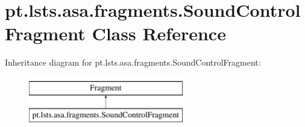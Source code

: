 \hypertarget{classpt_1_1lsts_1_1asa_1_1fragments_1_1SoundControlFragment}{}\section{pt.\+lsts.\+asa.\+fragments.\+Sound\+Control\+Fragment Class Reference}
\label{classpt_1_1lsts_1_1asa_1_1fragments_1_1SoundControlFragment}
Inheritance diagram for pt.\+lsts.\+asa.\+fragments.\+Sound\+Control\+Fragment\+:\begin{figure}[H]
\begin{center}
\leavevmode
\includegraphics[height=2.000000cm]{classpt_1_1lsts_1_1asa_1_1fragments_1_1SoundControlFragment}
\end{center}
\end{figure}
